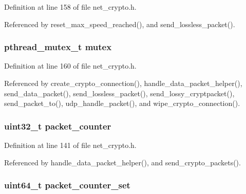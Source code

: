 Definition at line 158 of file net\+\_\+crypto.\+h.



Referenced by reset\+\_\+max\+\_\+speed\+\_\+reached(), and send\+\_\+lossless\+\_\+packet().

\hypertarget{struct_crypto___connection_a4acff8232e4aec9cd5c6dc200ac55ef3}{
\subsubsection[{mutex}]{\setlength{\rightskip}{0pt plus 5cm}pthread\+\_\+mutex\+\_\+t mutex}}\label{struct_crypto___connection_a4acff8232e4aec9cd5c6dc200ac55ef3}


Definition at line 160 of file net\+\_\+crypto.\+h.



Referenced by create\+\_\+crypto\+\_\+connection(), handle\+\_\+data\+\_\+packet\+\_\+helper(), send\+\_\+data\+\_\+packet(), send\+\_\+lossless\+\_\+packet(), send\+\_\+lossy\+\_\+cryptpacket(), send\+\_\+packet\+\_\+to(), udp\+\_\+handle\+\_\+packet(), and wipe\+\_\+crypto\+\_\+connection().

\hypertarget{struct_crypto___connection_a253e0640ca1d914e479ea37e97d1ba12}{
\subsubsection[{packet\+\_\+counter}]{\setlength{\rightskip}{0pt plus 5cm}uint32\+\_\+t packet\+\_\+counter}}\label{struct_crypto___connection_a253e0640ca1d914e479ea37e97d1ba12}


Definition at line 141 of file net\+\_\+crypto.\+h.



Referenced by handle\+\_\+data\+\_\+packet\+\_\+helper(), and send\+\_\+crypto\+\_\+packets().

\hypertarget{struct_crypto___connection_a77c1105a8f0d4de4daab379a572bb11c}{
\subsubsection[{packet\+\_\+counter\+\_\+set}]{\setlength{\rightskip}{0pt plus 5cm}uint64\+\_\+t packet\+\_\+counter\+\_\+set}}\label{struct_crypto___connection_a77c1105a8f0d4de4daab379a572bb11c}


